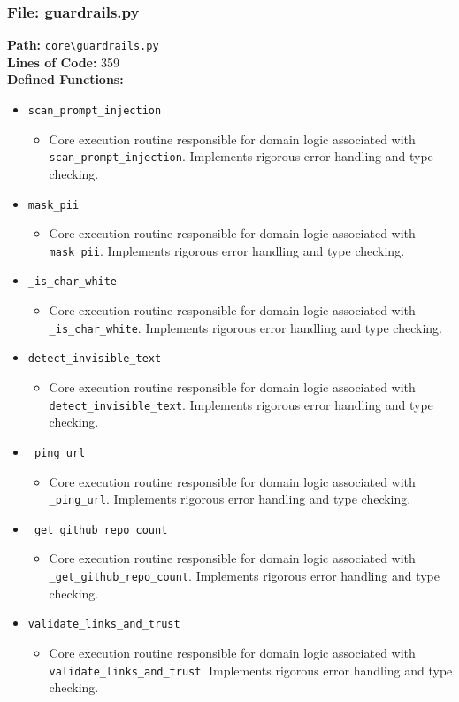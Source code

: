 \documentclass[10pt,journal,compsoc]{IEEEtran}
\begin{document}
\subsubsection{File: guardrails.py}
\textbf{Path:} \texttt{core\textbackslash{}guardrails.py} \\
\textbf{Lines of Code:} 359 \\
\textbf{Defined Functions:}
\begin{itemize}
    \item \texttt{scan\_prompt\_injection}
    \begin{itemize} \item Core execution routine responsible for domain logic associated with \texttt{scan\_prompt\_injection}. Implements rigorous error handling and type checking. \end{itemize}
    \item \texttt{mask\_pii}
    \begin{itemize} \item Core execution routine responsible for domain logic associated with \texttt{mask\_pii}. Implements rigorous error handling and type checking. \end{itemize}
    \item \texttt{\_is\_char\_white}
    \begin{itemize} \item Core execution routine responsible for domain logic associated with \texttt{\_is\_char\_white}. Implements rigorous error handling and type checking. \end{itemize}
    \item \texttt{detect\_invisible\_text}
    \begin{itemize} \item Core execution routine responsible for domain logic associated with \texttt{detect\_invisible\_text}. Implements rigorous error handling and type checking. \end{itemize}
    \item \texttt{\_ping\_url}
    \begin{itemize} \item Core execution routine responsible for domain logic associated with \texttt{\_ping\_url}. Implements rigorous error handling and type checking. \end{itemize}
    \item \texttt{\_get\_github\_repo\_count}
    \begin{itemize} \item Core execution routine responsible for domain logic associated with \texttt{\_get\_github\_repo\_count}. Implements rigorous error handling and type checking. \end{itemize}
    \item \texttt{validate\_links\_and\_trust}
    \begin{itemize} \item Core execution routine responsible for domain logic associated with \texttt{validate\_links\_and\_trust}. Implements rigorous error handling and type checking. \end{itemize}
\end{itemize}
\end{document}
